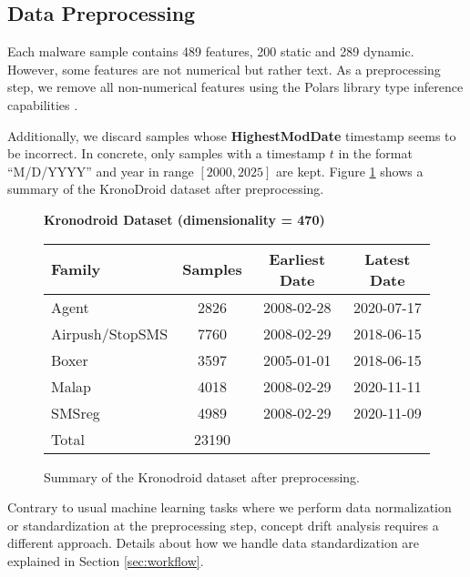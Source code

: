 \subsection{Data Preprocessing}
Each malware sample contains 489 features, 200 static and 289 dynamic. However, some features
are not numerical but rather text.
As a preprocessing step, we remove all non-numerical features using the Polars library
type inference capabilities \cite{polarsdatatypes}.

Additionally, we discard samples whose \textbf{HighestModDate} timestamp seems
to be incorrect. In concrete, only samples with a timestamp
$t$ in the format ``M/D/YYYY'' and year in range $[2000, 2025]$ are kept.
Figure \ref{fig:kronodroid_summary} shows a summary of the KronoDroid dataset
after preprocessing.

\begin{figure}[h!]
    \begin{center}
        \textbf{Kronodroid Dataset (dimensionality = 470)}
        \vspace{0.5cm}
        
        \begin{tabular}{lccc}
            \toprule
            \textbf{Family} & \textbf{Samples} & \textbf{Earliest Date} & \textbf{Latest Date} \\
            \midrule
            Agent               & 2826 & 2008-02-28 & 2020-07-17 \\
            Airpush/StopSMS     & 7760 & 2008-02-29 & 2018-06-15 \\
            Boxer               & 3597 & 2005-01-01 & 2018-06-15 \\
            Malap               & 4018 & 2008-02-29 & 2020-11-11 \\
            SMSreg              & 4989 & 2008-02-29 & 2020-11-09 \\
            \bottomrule
            Total             & 23190 \\
        \end{tabular}
        \caption{Summary of the Kronodroid dataset after preprocessing.}
        \label{fig:kronodroid_summary}
    \end{center}
\end{figure}

Contrary to usual machine learning tasks where we perform data normalization or standardization
at the preprocessing step, concept drift analysis requires a different approach. Details about
how we handle data standardization are explained in Section \ref{sec:workflow}.

